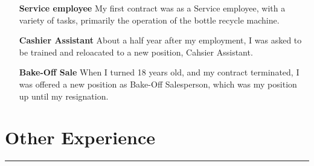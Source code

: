 \documentclass[a4paper]{report}
\def\secsep{\hrule width5cm}
\begin{document}
\begin{longtabu}
\begin{itemize}[leftmargin=11em]
        \item[\textbf{Service employee}] My first contract was as a Service employee,
            with a variety of tasks, primarily the operation of the bottle recycle machine.
        \item[\textbf{Cashier Assistant}] About a half year after my employment,
            I was asked to be trained and reloacated to a new position, Cahsier Assistant.
        \item[\textbf{Bake-Off Sale}] When I turned 18 years old, and my contract
            terminated, I was offered a new position as Bake-Off Salesperson, which was my
            position up until my resignation.%
    \end{itemize}
\end{longtabu}

\section*{Other Experience}
\secsep
\end{document}
